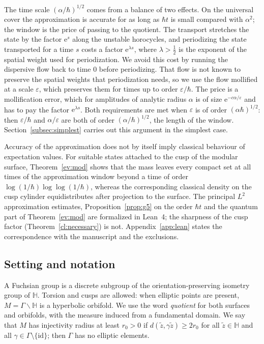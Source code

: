 \documentclass[twoside,10pt]{article}
\numberwithin{equation}{section}
\theoremstyle{slbody}
\theoremstyle{remark}
\newcommand{\Hb}{\mathbb{H}}
\newcommand{\ue}{\mathrm{e}}
\begin{document}
The time scale $(\alpha/\hbar)^{1/2}$ comes from a balance of two effects. On the universal cover the approximation is accurate
for as long as $\hbar t$ is small compared with $\alpha^2$; the window is the price of passing to the quotient. The transport
stretches the state by the factor $\ue^s$ along the unstable horocycles, and periodizing the state transported for a time $s$
costs a factor $\ue^{\lambda s}$, where $\lambda>\tfrac12$ is the exponent of the spatial weight used for periodization. We avoid this cost by running the dispersive flow back to time $0$ before
periodizing. That flow is not known to preserve the spatial weights that periodization needs, so we use the flow mollified at
a scale $\varepsilon$, which preserves them for times up to order $\varepsilon/\hbar$. The price is a mollification error, which
for amplitudes of analytic radius $\alpha$ is of size $\ue^{-c\alpha/\varepsilon}$ and has to pay the factor $\ue^{\lambda s}$. Both
requirements are met when $\varepsilon$ is of order $(\alpha\hbar)^{1/2}$: then $\varepsilon/\hbar$ and $\alpha/\varepsilon$ are both of
order $(\alpha/\hbar)^{1/2}$, the length of the window. Section~\ref{subsec:simplest} carries out this argument in the simplest
case.

Accuracy of the approximation does not by itself imply classical behaviour of expectation values.
For suitable states attached to the cusp of the modular surface, Theorem~\ref{ev:mod} shows that the mass leaves every
compact set at all times of the approximation window beyond a time of order $\log(1/\hbar)\log\log(1/\hbar)$, whereas
the corresponding classical density on the cusp cylinder equidistributes after projection to the surface.
The principal $L^2$ approximation estimates, Proposition~\ref{prop:g5} on the order $\hbar t$ and the quantum part of
Theorem~\ref{ev:mod} are formalized in Lean~4; the sharpness of the cusp factor (Theorem~\ref{cl:necessary}) is not.
Appendix~\ref{app:lean} states the correspondence with the manuscript and the exclusions.

\subsection{Setting and notation}\label{sec:setup}
A Fuchsian group is a discrete subgroup of the orientation-preserving isometry group of $\Hb$. Torsion and cusps are
allowed: when elliptic points are present, $M=\Gamma\backslash\Hb$ is a hyperbolic orbifold. We use the word \emph{quotient}
for both surfaces and orbifolds, with the measure induced from a fundamental domain. We say that $M$ has injectivity radius
at least $r_0>0$ if $d(\tilde z,\gamma\tilde z)\ge2r_0$ for all $\tilde z\in\Hb$ and all $\gamma\in\Gamma\setminus\{\mathrm{id}\}$; then
$\Gamma$ has no elliptic elements.
\end{document}
